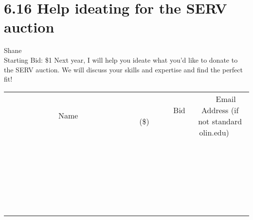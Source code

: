 \documentclass[11pt]{article}
\begin{document}
\section*{6.16 Help ideating for the SERV auction}
Shane
\\
Starting Bid: \$1
\newline
Next year, I will help you ideate what you'd like to donate to the SERV auction. We will discuss your skills and expertise and find the perfect fit!
\\[6ex]
\begin{tabular}{c c c}
~~~~~~~~~~~~~Name~~~~~~~~~~~~~ & ~~~~~~~~~Bid (\$)~~~~~~~~~  & ~~~Email Address (if not standard olin.edu)~~~\\
 & & \\
\hline
 & & \\
\hline
 & & \\
\hline
 & & \\
\hline
 & & \\
\hline
 & & \\
\hline
 & & \\
\hline
 & & \\
\hline
 & & \\
\hline
 & & \\
\hline
 & & \\
\hline
 & & \\
\hline
 & & \\
\hline
 & & \\
\hline
 & & \\
\hline
 & & \\
\hline
 & & \\
\hline
 & & \\
\hline
 & & \\
\hline
 & & \\
\hline
 & & \\
\hline
 & & \\
\hline
 & & \\
\hline
 & & \\
\hline
 & & \\
\hline
 & & \\
\hline
\end{tabular}
\newpage
\end{document}
